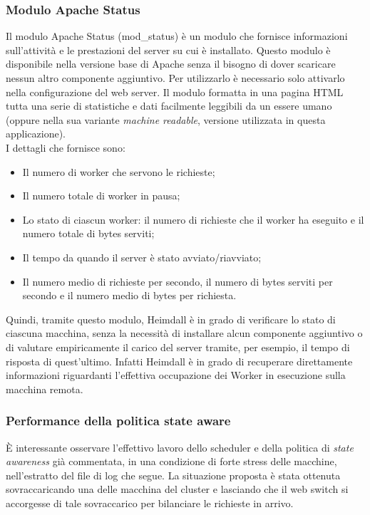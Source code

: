 \documentclass[italian]{tktltiki2}
\begin{document}
\subsubsection{Modulo Apache Status}
\label{sssec:apachestatus}
Il modulo Apache Status (mod\_status)\cite{mod_status} è un modulo che fornisce informazioni sull'attività e le prestazioni del server su cui è installato. Questo modulo è disponibile nella versione base di Apache senza il bisogno di dover scaricare nessun altro componente aggiuntivo. Per utilizzarlo è necessario solo attivarlo nella configurazione del web server. Il modulo formatta in una pagina HTML tutta una serie di statistiche e dati facilmente leggibili da un essere umano (oppure nella sua variante \emph{machine readable}, versione utilizzata in questa applicazione).
\\
I dettagli che fornisce sono:

\begin{itemize}
  \item Il numero di worker che servono le richieste;
  \item Il numero totale di worker in pausa;
  \item Lo stato di ciascun worker: il numero di richieste che il worker ha eseguito e il numero totale di bytes serviti;
  \item Il tempo da quando il server è stato avviato/riavviato;
  \item Il numero medio di richieste per secondo, il numero di bytes serviti per secondo e il numero medio di bytes per richiesta.
\end{itemize}
Quindi, tramite questo modulo, Heimdall è in grado di verificare lo stato di ciascuna macchina, senza la necessità di installare alcun componente aggiuntivo o di valutare empiricamente il carico del server tramite, per esempio, il tempo di risposta di quest'ultimo. Infatti Heimdall è in grado di recuperare direttamente informazioni riguardanti l'effettiva occupazione dei Worker in esecuzione sulla macchina remota.

\subsubsection{Performance della politica state aware}
È interessante osservare l'effettivo lavoro dello scheduler e della politica di \emph{state awareness} già commentata, in una condizione di forte stress delle macchine, nell'estratto del file di log che segue. La situazione proposta è stata ottenuta sovraccaricando una delle macchina del cluster e lasciando che il web switch si accorgesse di tale sovraccarico per bilanciare le richieste in arrivo.
\end{document}
